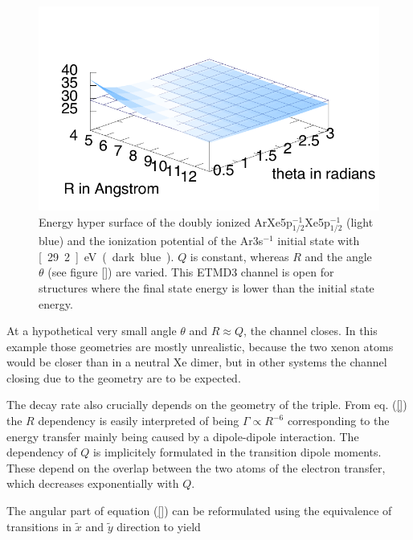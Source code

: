 \begin{figure}[h]
 \centering
 \includegraphics[]{pics/ArXeXe12_12_surf.pdf}
 \caption{Energy hyper surface of the doubly ionized
          ArXe5p$_{1/2}^{-1}$Xe5p$_{1/2}^{-1}$ (light blue) and the ionization
          potential of the Ar3s$^{-1}$ initial state with \unit[29.2]{eV}
          (dark blue). $Q$ is constant, whereas $R$ and the angle $\theta$
          (see figure \ref{}) are varied. This ETMD3 channel is open for
          structures where
          the final state energy is lower than the initial state energy.}
 \label{figure:ArXe2_geom_energy}
\end{figure}

At a hypothetical very small angle $\theta$ and $R\approx Q$, the channel closes.
In this example those geometries are mostly unrealistic, because the two xenon
atoms would be closer than in a neutral Xe dimer, but in other systems the
channel closing due to the geometry are to be expected.


The decay rate also crucially depends on the geometry of the triple.
From eq. (\ref{}) the $R$ dependency is easily interpreted of being
$\Gamma \propto R^{-6}$ corresponding to the energy transfer mainly being
caused by a dipole-dipole interaction. The dependency of $Q$ is implicitely
formulated in the transition dipole moments. These depend on the overlap
between the two atoms of the electron transfer, which decreases exponentially
with $Q$.



The angular part of equation (\ref{}) can be reformulated using
the equivalence of transitions in $\tilde{x}$ and $\tilde{y}$ direction to
yield


